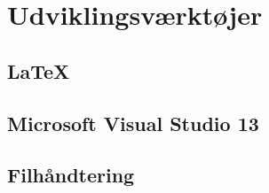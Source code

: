\chapter{Udviklingsværktøjer} 

\section{LaTeX}

\section{Microsoft Visual Studio 13}

\section{Filhåndtering}
